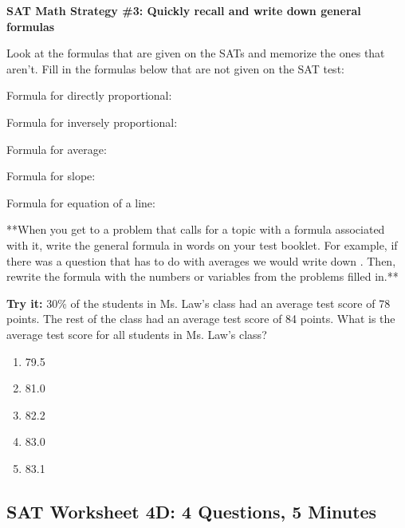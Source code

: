 \vfill
\pagebreak
\textbf{SAT Math Strategy \#3: Quickly recall and write down general formulas}

Look at the formulas that are given on the SATs and memorize the ones that aren't. Fill in the formulas below that are not given on the SAT test:

\bigskip
Formula for directly proportional:

\bigskip
Formula for inversely proportional:

\bigskip
Formula for average:

\bigskip
Formula for slope:

\bigskip
Formula for equation of a line:

\bigskip
**When you get to a problem that calls for a topic with a formula associated with it, write the general formula in words on your test booklet. For example, if there was a question that has to do with averages we would write down \longline. Then, rewrite the formula with the numbers or variables from the problems filled in.**

\vfill
\textbf{Try it:} 30\% of the students in Ms. Law's class had an average test score of 78 points. The rest of the class had an average test score of 84 points. What is the average test score for all students in Ms. Law's class?

\begin{enumerate}[label=(\Alph*)]
\item 79.5
\item 81.0
\item 82.2
\item 83.0
\item 83.1
\end{enumerate}

\vfill
\newpage
\subsection{SAT Worksheet 4D: 4 Questions, 5 Minutes}

